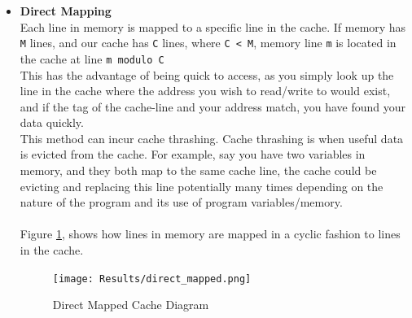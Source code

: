 \documentclass[bsc,frontabs,twoside,singlespacing,parskip,deptreport]{infthesis}     %
\begin{document}
\begin{itemize}
    \item{
        {\bf Direct Mapping} \\
        Each line in memory is mapped to a specific line in the cache. If memory has \texttt{M} lines, and our cache has \texttt{C} lines, where \texttt{C < M}, memory line \texttt{m} is located in the cache at line \texttt{m modulo C}\\
        This has the advantage of being quick to access, as you simply look up the line in the cache where the address you wish to read/write to would exist, and if the tag of the cache-line and your address match, you have found your data quickly. \\
        This method can incur cache thrashing. Cache thrashing is when useful data is evicted from the cache. For example, say you have two variables in memory, and they both map to the same cache line, the cache could be evicting and replacing this line potentially many times depending on the nature of the program and its use of program variables/memory. \\
        \\
        Figure \ref{fig:dir-map}, shows how lines in memory are mapped in a cyclic fashion to lines in the cache.
    }
    \begin{figure}[h]
        \texttt{[image: Results/direct\_mapped.png]}
        \centering
        \caption{Direct Mapped Cache Diagram}
        \label{fig:dir-map}
    \end{figure}
    

\end{itemize}
\end{document}
